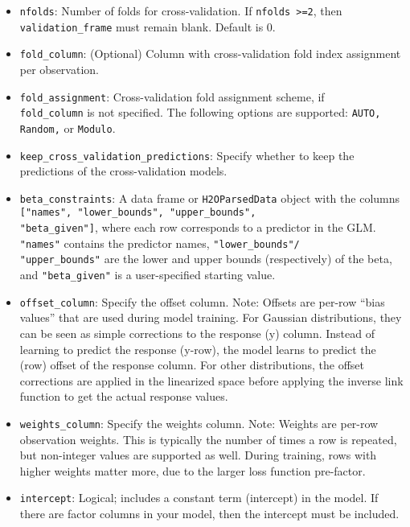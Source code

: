 \begin{itemize}
\item \texttt{nfolds}: Number of folds for cross-validation. If \texttt{nfolds >=2}, then \texttt{validation\_frame} must remain blank. Default is 0. %
\item \texttt{fold\_column}: (Optional) Column with cross-validation fold index assignment per observation. 
\item \texttt{fold\_assignment}: Cross-validation fold assignment scheme, if \\ \texttt{fold\_column} is not specified. The following options are supported: \texttt{AUTO, Random,} or \texttt{Modulo}. 
\item \texttt{keep\_cross\_validation\_predictions}: Specify whether to keep the predictions of the cross-validation models. 
\item \texttt{beta\_constraints}: A data frame or \texttt{H2OParsedData} object with the columns \texttt{["names", "lower\_bounds", "upper\_bounds", \\ "beta\_given"]}, where each row corresponds to a predictor in the GLM. \texttt{"names"} contains the predictor names, \texttt{"lower\_bounds"/ \\ "upper\_bounds"} are the lower and upper bounds (respectively) of the beta, and  \texttt{"beta\_given"} is a user-specified starting value. 
\item \texttt{offset\_column}: Specify the offset column. Note: Offsets are per-row “bias values” that are used during model training. For Gaussian distributions, they can be seen as simple corrections to the response (y) column. Instead of learning to predict the response (y-row), the model learns to predict the (row) offset of the response column. For other distributions, the offset corrections are applied in the linearized space before applying the inverse link function to get the actual response values. 
\item \texttt{weights\_column}: Specify the weights column. Note: Weights are per-row observation weights. This is typically the number of times a row is repeated, but non-integer values are supported as well. During training, rows with higher weights matter more, due to the larger loss function pre-factor.
\item \texttt{intercept}: Logical; includes a constant term (intercept) in the model. If there are factor columns in your model, then the intercept must be included. %
\end{itemize}

